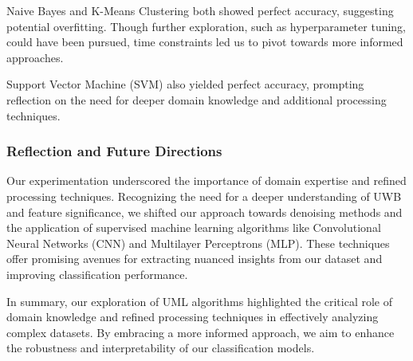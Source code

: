 Naive Bayes and K-Means Clustering both showed perfect accuracy, suggesting potential overfitting. Though further exploration, such as hyperparameter tuning, could have been pursued, time constraints led us to pivot towards more informed approaches.

Support Vector Machine (SVM) also yielded perfect accuracy, prompting reflection on the need for deeper domain knowledge and additional processing techniques.

\subsubsection{Reflection and Future Directions}

Our experimentation underscored the importance of domain expertise and refined processing techniques. Recognizing the need for a deeper understanding of UWB and feature significance, we shifted our approach towards denoising methods and the application of supervised machine learning algorithms like Convolutional Neural Networks (CNN) and Multilayer Perceptrons (MLP). These techniques offer promising avenues for extracting nuanced insights from our dataset and improving classification performance.

In summary, our exploration of UML algorithms highlighted the critical role of domain knowledge and refined processing techniques in effectively analyzing complex datasets. By embracing a more informed approach, we aim to enhance the robustness and interpretability of our classification models.
